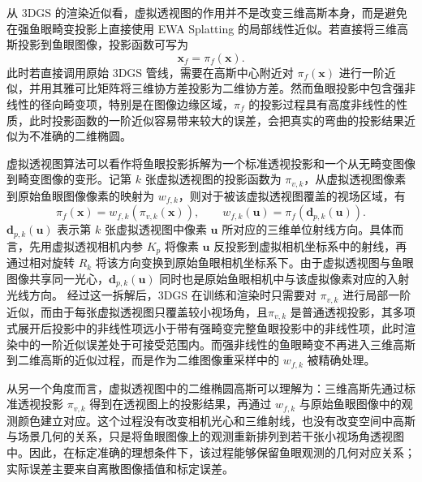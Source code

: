 从 3DGS 的渲染近似看，虚拟透视图的作用并不是改变三维高斯本身，而是避免在强鱼眼畸变投影上直接使用 EWA Splatting \cite{zwicker2002ewa} 的局部线性近似。若直接将三维高斯投影到鱼眼图像，投影函数可写为
\begin{equation}
    \label{equ:method-direct-fisheye-projection}
    \mathbf{x}_f
    =
    \pi_f(\mathbf{x}).
\end{equation}
此时若直接调用原始 3DGS 管线，需要在高斯中心附近对 \(\pi_f(\mathbf{x})\) 进行一阶近似，并用其雅可比矩阵将三维协方差投影为二维协方差。然而鱼眼投影中包含强非线性的径向畸变项，特别是在图像边缘区域，\(\pi_f\) 的投影过程具有高度非线性的性质，此时投影函数的一阶近似容易带来较大的误差，会把真实的弯曲的投影结果近似为不准确的二维椭圆。

虚拟透视图算法可以看作将鱼眼投影拆解为一个标准透视投影和一个从无畸变图像到畸变图像的变形。记第 \(k\) 张虚拟透视图的投影函数为 \(\pi_{v,k}\)，从虚拟透视图像素到原始鱼眼图像像素的映射为 \(w_{f,k}\)，则对于被该虚拟透视图覆盖的视场区域，有
\begin{equation}
    \label{equ:method-fisheye-decomposition}
    \pi_f(\mathbf{x})
    =
    w_{f,k}\!\left(\pi_{v,k}(\mathbf{x})\right),
    \qquad
    w_{f,k}(\mathbf{u})
    =
    \pi_f\!\left(\mathbf{d}_{p,k}(\mathbf{u})\right).
\end{equation}
\(\mathbf{d}_{p,k}(\mathbf{u})\) 表示第 \(k\) 张虚拟透视图中像素 \(\mathbf{u}\) 所对应的三维单位射线方向。具体而言，先用虚拟透视相机内参 \(K_p\) 将像素 \(\mathbf{u}\) 反投影到虚拟相机坐标系中的射线，再通过相对旋转 \(R_k\) 将该方向变换到原始鱼眼相机坐标系下。由于虚拟透视图与鱼眼图像共享同一光心，\(\mathbf{d}_{p,k}(\mathbf{u})\) 同时也是原始鱼眼相机中与该虚拟像素对应的入射光线方向。
经过这一拆解后，3DGS 在训练和渲染时只需要对 \(\pi_{v,k}\) 进行局部一阶近似，而由于每张虚拟透视图只覆盖较小视场角，且\(\pi_{v,k}\) 是普通透视投影，其多项式展开后投影中的非线性项远小于带有强畸变完整鱼眼投影中的非线性项，此时渲染中的一阶近似误差处于可接受范围内。而强非线性的鱼眼畸变不再进入三维高斯到二维高斯的近似过程，而是作为二维图像重采样中的 \(w_{f,k}\) 被精确处理。

从另一个角度而言，虚拟透视图中的二维椭圆高斯可以理解为：三维高斯先通过标准透视投影 \(\pi_{v,k}\) 得到在透视图上的投影结果，再通过 \(w_{f,k}\) 与原始鱼眼图像中的观测颜色建立对应。这个过程没有改变相机光心和三维射线，也没有改变空间中高斯与场景几何的关系，只是将鱼眼图像上的观测重新排列到若干张小视场角透视图中。因此，在标定准确的理想条件下，该过程能够保留鱼眼观测的几何对应关系；实际误差主要来自离散图像插值和标定误差。

